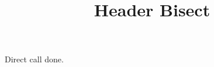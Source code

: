 \documentclass[type=zwischenbericht]{zukunftbau}
\title{Header Bisect}
\begin{document}
\makeatletter
\gdef\semio@window@header@number{}
\gdef\semio@window@header@title{Zitat}
\semio@window@header@invoke
\par Direct call done.
\makeatother
\end{document}
